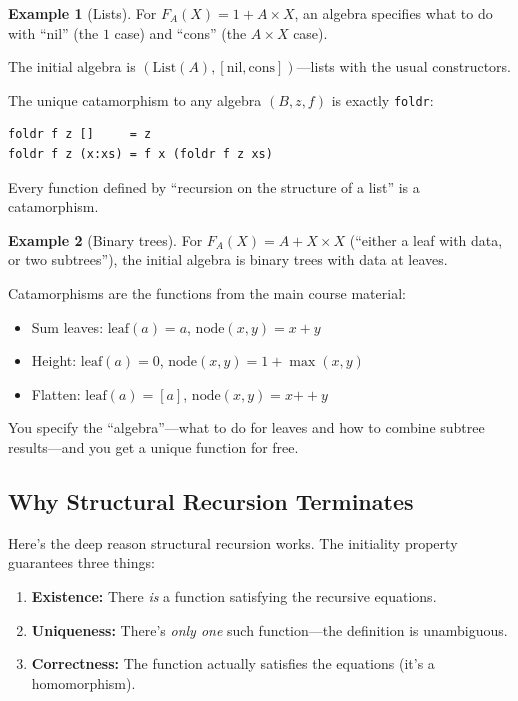 \documentclass[11pt]{article}
\theoremstyle{definition}
\newtheorem{example}{Example}[section]
\theoremstyle{plain}
\theoremstyle{remark}
\begin{document}
\begin{example}[Lists]
For $F_A(X) = 1 + A \times X$, an algebra specifies what to do with ``nil'' (the $1$ case) and ``cons'' (the $A \times X$ case).

The initial algebra is $(\text{List}(A), [\text{nil}, \text{cons}])$---lists with the usual constructors.

The unique catamorphism to any algebra $(B, z, f)$ is exactly \texttt{foldr}:
\begin{verbatim}
foldr f z []     = z
foldr f z (x:xs) = f x (foldr f z xs)
\end{verbatim}
Every function defined by ``recursion on the structure of a list'' is a catamorphism.
\end{example}

\begin{example}[Binary trees]
For $F_A(X) = A + X \times X$ (``either a leaf with data, or two subtrees''), the initial algebra is binary trees with data at leaves.

Catamorphisms are the functions from the main course material:
\begin{itemize}
  \item Sum leaves: $\text{leaf}(a) = a$, $\text{node}(x, y) = x + y$
  \item Height: $\text{leaf}(a) = 0$, $\text{node}(x, y) = 1 + \max(x, y)$
  \item Flatten: $\text{leaf}(a) = [a]$, $\text{node}(x, y) = x \mathbin{+\!\!+} y$
\end{itemize}
You specify the ``algebra''---what to do for leaves and how to combine subtree results---and you get a unique function for free.
\end{example}

\subsection{Why Structural Recursion Terminates}

Here's the deep reason structural recursion works. The initiality property guarantees three things:
\begin{enumerate}
  \item \textbf{Existence:} There \emph{is} a function satisfying the recursive equations.
  \item \textbf{Uniqueness:} There's \emph{only one} such function---the definition is unambiguous.
  \item \textbf{Correctness:} The function actually satisfies the equations (it's a homomorphism).
\end{enumerate}
\end{document}
